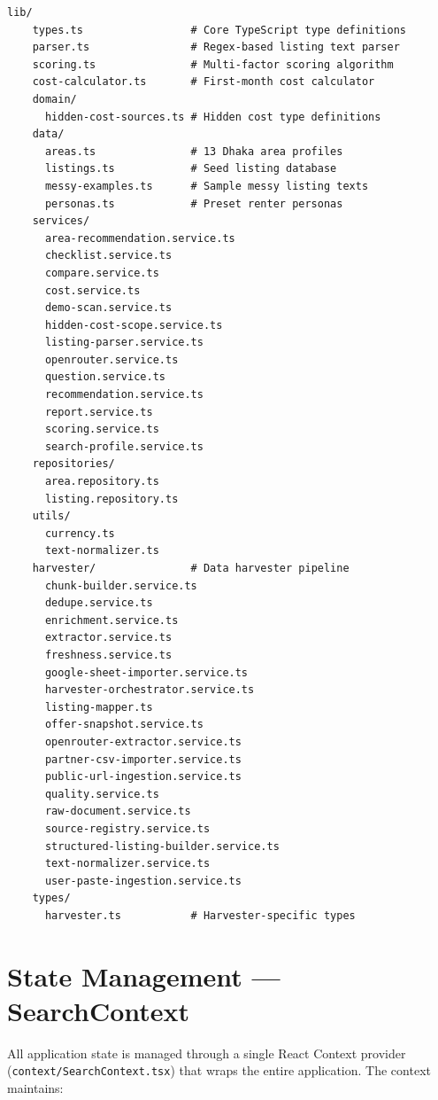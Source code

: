 \documentclass[12pt, a4paper, oneside]{report}
\newcommand{\filepath}[1]{\texttt{\small\color{codeblue}#1}}
\begin{document}
\begin{lstlisting}[language={}, caption={Project Directory Tree}]
  lib/
    types.ts                 # Core TypeScript type definitions
    parser.ts                # Regex-based listing text parser
    scoring.ts               # Multi-factor scoring algorithm
    cost-calculator.ts       # First-month cost calculator
    domain/
      hidden-cost-sources.ts # Hidden cost type definitions
    data/
      areas.ts               # 13 Dhaka area profiles
      listings.ts            # Seed listing database
      messy-examples.ts      # Sample messy listing texts
      personas.ts            # Preset renter personas
    services/
      area-recommendation.service.ts
      checklist.service.ts
      compare.service.ts
      cost.service.ts
      demo-scan.service.ts
      hidden-cost-scope.service.ts
      listing-parser.service.ts
      openrouter.service.ts
      question.service.ts
      recommendation.service.ts
      report.service.ts
      scoring.service.ts
      search-profile.service.ts
    repositories/
      area.repository.ts
      listing.repository.ts
    utils/
      currency.ts
      text-normalizer.ts
    harvester/               # Data harvester pipeline
      chunk-builder.service.ts
      dedupe.service.ts
      enrichment.service.ts
      extractor.service.ts
      freshness.service.ts
      google-sheet-importer.service.ts
      harvester-orchestrator.service.ts
      listing-mapper.ts
      offer-snapshot.service.ts
      openrouter-extractor.service.ts
      partner-csv-importer.service.ts
      public-url-ingestion.service.ts
      quality.service.ts
      raw-document.service.ts
      source-registry.service.ts
      structured-listing-builder.service.ts
      text-normalizer.service.ts
      user-paste-ingestion.service.ts
    types/
      harvester.ts           # Harvester-specific types
\end{lstlisting}


\section{State Management --- SearchContext}

All application state is managed through a single React Context provider (\filepath{context/SearchContext.tsx}) that wraps the entire application. The context maintains:
\end{document}
